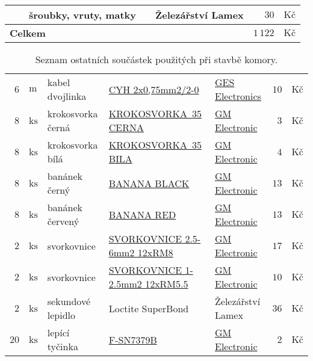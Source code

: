 \begin{table}[h]
\begin{tabular}[t]{|r@{$\,$}l|p{4.6cm}|p{4.2cm}|p{3.1cm}|r@{$\,$}l|}
					&					 & šroubky, vruty, matky 								&																																																			& Železářství Lamex																		&	$ 30 $ & $\textrm{Kč} $	\\	
		\hline\hline
		\multicolumn{5}{|l|}{\textbf{Celkem}} & $ 1\,122 $ & $ \textrm{Kč} $ \\
		\hline
	\end{tabular}
\end{table}

\begin{table}[h]
	\centering
	\caption{Seznam ostatních součástek použitých při stavbě komory.}
	\label{tab:SeznamSoucastek:Ostatni}
	\begin{tabular}[t]{|r@{$\,$}l|p{4.6cm}|p{4.2cm}|p{3.1cm}|r@{$\,$}l|}
		\hline
		$ 6 $ & $\mathrm{m} $ & kabel dvojlinka										&	\href{http://www.ges.cz/-cyh-2x075mm22-0-ges06900210.html}{CYH 2x0,75mm2/2-0}											&	\href{http://www.ges.cz}{GES Electronics}								&	$ 10 $ & $\textrm{Kč} $	\\
		$ 8 $ & $\mathrm{ks} $ & krokosvorka černá								 &	\href{http://www.gme.cz/cz/-p812-027.html}{KROKOSVORKA~35 CERNA}																&	\href{http://www.gme.cz}{GM Electronic}										&	$ 3 $ & $\textrm{Kč} $	\\	
		$ 8 $ & $\mathrm{ks} $ & krokosvorka bílá									 &	\href{http://www.gme.cz/cz/-p812-011.html}{KROKOSVORKA~35 BILA}																		&	\href{http://www.gme.cz}{GM Electronic}										&	$ 4 $ & $\textrm{Kč} $	\\	
		$ 8 $ & $\mathrm{ks} $ & banánek černý									 &	\href{http://www.gme.cz/cz/-p811-017.html}{BANANA BLACK}																						&	\href{http://www.gme.cz}{GM Electronic}										&	$ 13 $ & $\textrm{Kč} $	\\	
		$ 8 $ & $\mathrm{ks} $ & banánek červený								 &	\href{http://www.gme.cz/cz/-p811-004.html}{BANANA RED}																							&	\href{http://www.gme.cz}{GM Electronic}										&	$ 13 $ & $\textrm{Kč} $	\\	
		$ 2 $ & $\mathrm{ks} $ & svorkovnice										 &	\href{http://www.gme.cz/cz/svorkovnice-2-5-6mm2-12xrm8-p821-329.html}{SVORKOVNICE 2.5-6mm2 12xRM8}		&	\href{http://www.gme.cz}{GM Electronic}								&	$ 17 $ & $\textrm{Kč} $	\\	
		$ 2 $ & $\mathrm{ks} $ & svorkovnice										 &	\href{http://www.gme.cz/cz/svorkovnice-1-2-5mm2-12xrm5-5-p821-328.html}{SVORKOVNICE 1-2.5mm2 12xRM5.5}	&	\href{http://www.gme.cz}{GM Electronic}							&	$ 10 $ & $\textrm{Kč} $	\\	
		$ 2 $ & $\mathrm{ks} $ & sekundové lepidlo	 							&	Loctite SuperBond																																									&	 Železářství Lamex																			&	$ 36 $ & $\textrm{Kč} $	\\	
		$ 20 $ & $\mathrm{ks} $ & lepící tyčinka									 &	\href{http://www.gme.cz/cz/f-sn7379b-p731-047.html}{F-SN7379B}																				&	\href{http://www.gme.cz}{GM Electronic}										&	$ 2 $ & $\textrm{Kč} $	\\	
				

\end{tabular}
\end{table}
